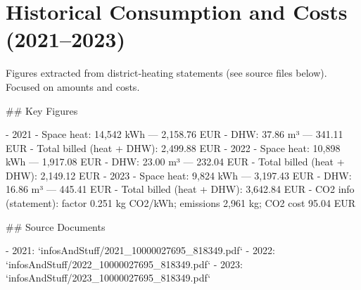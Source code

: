 \documentclass[11pt,oneside]{report}
\begin{document}
\chapter{Historical Consumption and Costs (2021--2023)}
\begin{markdown}
Figures extracted from district‑heating statements (see source files below). Focused on amounts and costs.

## Key Figures

- 2021
  - Space heat: 14,542 kWh — 2,158.76 EUR
  - DHW: 37.86 m³ — 341.11 EUR
  - Total billed (heat + DHW): 2,499.88 EUR
- 2022
  - Space heat: 10,898 kWh — 1,917.08 EUR
  - DHW: 23.00 m³ — 232.04 EUR
  - Total billed (heat + DHW): 2,149.12 EUR
- 2023
  - Space heat: 9,824 kWh — 3,197.43 EUR
  - DHW: 16.86 m³ — 445.41 EUR
  - Total billed (heat + DHW): 3,642.84 EUR
  - CO2 info (statement): factor 0.251 kg CO2/kWh; emissions 2,961 kg; CO2 cost 95.04 EUR

## Source Documents

- 2021: `infosAndStuff/2021_10000027695_818349.pdf`
- 2022: `infosAndStuff/2022_10000027695_818349.pdf`
- 2023: `infosAndStuff/2023_10000027695_818349.pdf`
\end{markdown}
\end{document}
